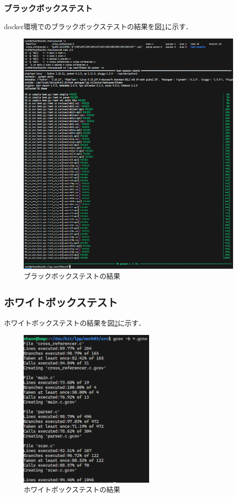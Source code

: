 \documentclass{jlreq}
\begin{document}
\subsubsection{ブラックボックステスト}
docker環境でのブラックボックステストの結果を図\ref{fig:black_box_test}に示す．
\begin{figure}[H]
  \centering
  \includegraphics[width=\textwidth]{assets/black_box_test.png}
  \caption{ブラックボックステストの結果}
  \label{fig:black_box_test}
\end{figure}

\subsection{ホワイトボックステスト}
ホワイトボックステストの結果を図\ref{fig:white_box_test}に示す．
\begin{figure}[H]
  \centering
  \includegraphics[width=0.6\textwidth]{assets/white_box_test.png}
  \caption{ホワイトボックステストの結果}
  \label{fig:white_box_test}
\end{figure}
\end{document}
